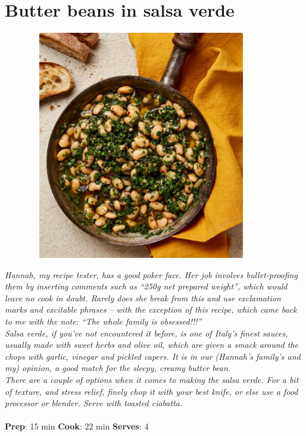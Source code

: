 \documentclass{book}
\begin{document}
\section{Butter beans in salsa verde}
\begin{figure}
\centering\includegraphics[width=10cm,height=10cm,keepaspectratio]{Recipe_Pictures/Butter_beans_in_salsa_verde.png}
\end{figure}
\emph{Hannah, my recipe tester, has a good poker face. Her job involves bullet-proofing them by inserting comments such as “250g net prepared weight”, which would leave no cook in doubt. Rarely does she break from this and use exclamation marks and excitable phrases – with the exception of this recipe, which came back to me with the note: “The whole family is obsessed!!!”\\ 
Salsa verde, if you’ve not encountered it before, is one of Italy’s finest sauces, usually made with sweet herbs and olive oil, which are given a smack around the chops with garlic, vinegar and pickled capers. It is in our (Hannah’s family’s and my) opinion, a good match for the sleepy, creamy butter bean.\\ 
There are a couple of options when it comes to making the salsa verde. For a bit of texture, and stress relief, finely chop it with your best knife, or else use a food processor or blender. Serve with toasted ciabatta.}\\\\ 
\textbf{Prep}: 15 min
\textbf{Cook}: 22 min
\textbf{Serves}: 4
\end{document}
